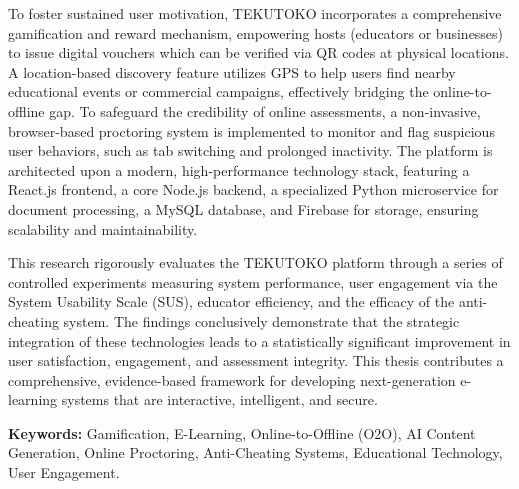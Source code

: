 To foster sustained user motivation, TEKUTOKO incorporates a comprehensive gamification and reward mechanism, empowering hosts (educators or businesses) to issue digital vouchers which can be verified via QR codes at physical locations. A location-based discovery feature utilizes GPS to help users find nearby educational events or commercial campaigns, effectively bridging the online-to-offline gap. To safeguard the credibility of online assessments, a non-invasive, browser-based proctoring system is implemented to monitor and flag suspicious user behaviors, such as tab switching and prolonged inactivity. The platform is architected upon a modern, high-performance technology stack, featuring a React.js frontend, a core Node.js backend, a specialized Python microservice for document processing, a MySQL database, and Firebase for storage, ensuring scalability and maintainability.

This research rigorously evaluates the TEKUTOKO platform through a series of controlled experiments measuring system performance, user engagement via the System Usability Scale (SUS), educator efficiency, and the efficacy of the anti-cheating system. The findings conclusively demonstrate that the strategic integration of these technologies leads to a statistically significant improvement in user satisfaction, engagement, and assessment integrity. This thesis contributes a comprehensive, evidence-based framework for developing next-generation e-learning systems that are interactive, intelligent, and secure.

\vspace{1cm}
\noindent\textbf{Keywords:} Gamification, E-Learning, Online-to-Offline (O2O), AI Content Generation, Online Proctoring, Anti-Cheating Systems, Educational Technology, User Engagement.

\cleardoublepage